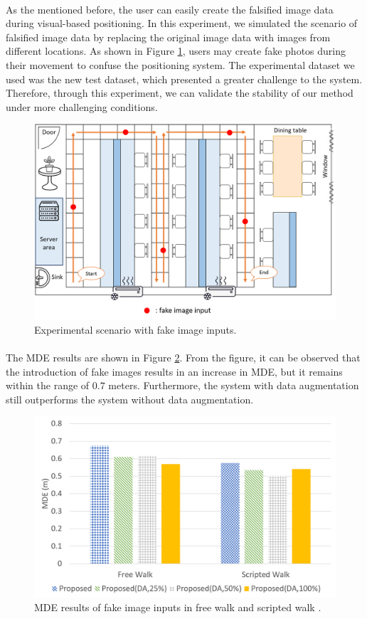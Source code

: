 \documentclass[a4paper,12pt]{report}
\begin{document}
\paragraph{}
As the mentioned before, the user can easily create the falsified image data during visual-based positioning. In this experiment, we simulated the scenario of falsified image data by replacing the original image data with images from different locations. As shown in Figure \ref{Fig:fake_walk}, users may create fake photos during their movement to confuse the positioning system. The experimental dataset we used was the new test dataset, which presented a greater challenge to the system. Therefore, through this experiment, we can validate the stability of our method under more challenging conditions.
\begin{figure}[h]
    \centering
    \includegraphics[width=0.7\columnwidth]{images/chap5-5/fake_walk.png}
    \caption{Experimental scenario with fake image inputs.}
    \label{Fig:fake_walk}
\end{figure}
\paragraph{}
The MDE results are shown in Figure \ref{Fig:fake_i}. From the figure, it can be observed that the introduction of fake images results in an increase in MDE, but it remains within the range of $0.7$ meters. Furthermore, the system with data augmentation still outperforms the system without data augmentation.
\begin{figure}[h]
    \centering
    \includegraphics[width=0.65\columnwidth]{images/chap5-5/fake_i.png}
    \caption{MDE results of fake image inputs in free walk and scripted walk .}
    \label{Fig:fake_i}
\end{figure}
\end{document}
